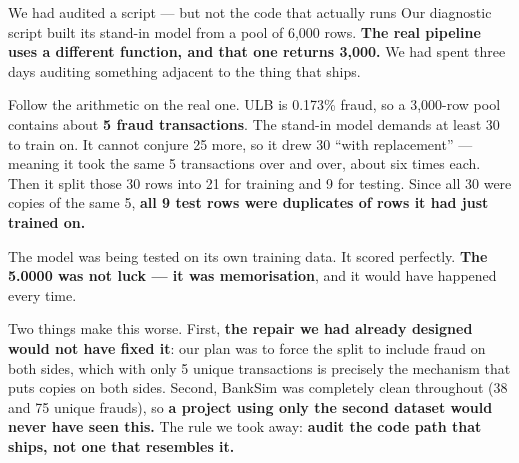 \documentclass[11pt]{article}
\begin{document}
\begin{warnbox}{We had audited a script --- but not the code that actually runs}
Our diagnostic script built its stand-in model from a pool of 6{,}000 rows. \textbf{The real pipeline
uses a different function, and that one returns 3{,}000.} We had spent three days auditing something
adjacent to the thing that ships.

Follow the arithmetic on the real one. ULB is 0.173\% fraud, so a 3{,}000-row pool contains about
\textbf{5 fraud transactions}. The stand-in model demands at least 30 to train on. It cannot conjure 25
more, so it drew 30 ``with replacement'' --- meaning it took the same 5 transactions over and over,
about six times each. Then it split those 30 rows into 21 for training and 9 for testing. Since all 30
were copies of the same 5, \textbf{all 9 test rows were duplicates of rows it had just trained on.}

The model was being tested on its own training data. It scored perfectly. \textbf{The 5.0000 was not
luck --- it was memorisation}, and it would have happened every time.

Two things make this worse. First, \textbf{the repair we had already designed would not have fixed it}:
our plan was to force the split to include fraud on both sides, which with only 5 unique transactions is
precisely the mechanism that puts copies on both sides. Second, BankSim was completely clean throughout
(38 and 75 unique frauds), so \textbf{a project using only the second dataset would never have seen
this.} The rule we took away: \textbf{audit the code path that ships, not one that resembles it.}
\end{warnbox}
\end{document}
